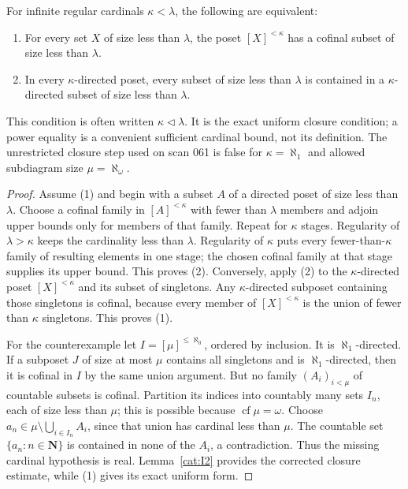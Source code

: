 \begin{proposition}\label{cat:I9}
For infinite regular cardinals $\kappa<\lambda$, the following are
equivalent:
\begin{enumerate}
\item For every set $X$ of size less than $\lambda$, the poset
$[X]^{<\kappa}$ has a cofinal subset of size less than $\lambda$.
\item In every $\kappa$-directed poset, every subset of size less than
$\lambda$ is contained in a $\kappa$-directed subset of size less than
$\lambda$.
\end{enumerate}
This condition is often written $\kappa\mathrel{\triangleleft}\lambda$.
It is the exact uniform closure condition; a power equality is a
convenient sufficient cardinal bound, not its definition.
The unrestricted closure step used on scan 061 is false for
$\kappa=\aleph_1$ and allowed subdiagram size $\mu=\aleph_\omega$.
\end{proposition}
\begin{proof}
Assume (1) and begin with a subset $A$ of a directed poset of size
less than $\lambda$.  Choose a cofinal family in $[A]^{<\kappa}$
with fewer than $\lambda$ members and adjoin upper bounds only for
members of that family.  Repeat for $\kappa$ stages.  Regularity of
$\lambda>\kappa$ keeps the cardinality less than $\lambda$.
Regularity of $\kappa$ puts every fewer-than-$\kappa$ family of
resulting elements in one stage; the chosen cofinal family at that
stage supplies its upper bound.  This proves (2).
Conversely, apply (2) to the $\kappa$-directed poset
$[X]^{<\kappa}$ and its subset of singletons.
Any $\kappa$-directed subposet containing those singletons is
cofinal, because every member of $[X]^{<\kappa}$ is the union of
fewer than $\kappa$ singletons.  This proves (1).

For the counterexample let $I=[\mu]^{\leq\aleph_0}$, ordered by
inclusion.  It is $\aleph_1$-directed.  If a subposet $J$ of size
at most $\mu$ contains all singletons and is $\aleph_1$-directed,
then it is cofinal in $I$ by the same union argument.
But no family $(A_i)_{i<\mu}$ of countable subsets is cofinal.
Partition its indices into countably many sets $I_n$, each of size
less than $\mu$; this is possible because $\operatorname{cf}\mu=\omega$.
Choose $a_n\in\mu\setminus\bigcup_{i\in I_n}A_i$, since that union
has cardinal less than $\mu$.  The countable set $\{a_n:n\in\mathbf N\}$
is contained in none of the $A_i$, a contradiction.
Thus the missing cardinal hypothesis is real.  Lemma~\ref{cat:I2}
provides the corrected closure estimate, while (1) gives its exact
uniform form.
\end{proof}

